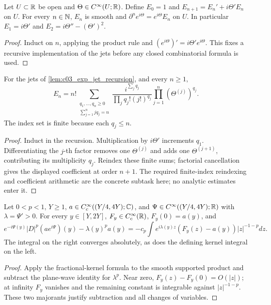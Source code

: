 \begin{lemma}
  \label{lem:c03_exp_jet_recursion}
  Let $U\subset\mathbb{R}$ be open and $\Theta\in C^\infty(U;\mathbb{R})$.
  Define $E_0=1$ and $E_{n+1}=E_n'+i\Theta'E_n$ on $U$.
  For every $n\in\mathbb{N}$, $E_n$ is smooth and
  $\partial^n e^{i\Theta}=e^{i\Theta}E_n$ on $U$.
  In particular $E_1=i\Theta'$ and $E_2=i\Theta''-(\Theta')^2$.
\end{lemma}
\begin{proof}
  Induct on $n$, applying the product rule and $(e^{i\Theta})'=i\Theta'e^{i\Theta}$.
  This fixes a recursive implementation of the jets before any closed combinatorial formula is used.
\end{proof}

\begin{lemma}
  \label{lem:c03_exp_jet_coefficients}
  For the jets of \cref{lem:c03_exp_jet_recursion}, and every $n\ge1$,
  \[
    E_n=n!\sum_{\substack{q_1,\ldots,q_n\ge0\\\sum_{j=1}^n j q_j=n}}
       \frac{i^{\sum_jq_j}}{\prod_jq_j!(j!)^{q_j}}
       \prod_{j=1}^n(\Theta^{(j)})^{q_j}.
  \]
  The index set is finite because each $q_j\le n$.
\end{lemma}
\begin{proof}
  Induct in the recursion. Multiplication by $i\Theta'$ increments $q_1$.
  Differentiating the $j$-th factor removes one $\Theta^{(j)}$ and adds one $\Theta^{(j+1)}$,
  contributing its multiplicity $q_j$. Reindex these finite sums; factorial cancellation gives
  the displayed coefficient at order $n+1$. The required finite-index reindexing and coefficient
  arithmetic are the concrete subtask here; no analytic estimates enter it.
\end{proof}

\begin{lemma}
  \label{lem:c03_mult_kernel_identity}
  Let $0<p<1$, $Y\ge1$, $a\in C_c^\infty((Y/4,4Y);\mathbb{C})$, and
  $\Psi\in C^\infty((Y/4,4Y);\mathbb{R})$ with $\lambda=\Psi'>0$.
  For every $y\in[Y,2Y]$, $F_y\in C_c^\infty(\mathbb{R})$, $F_y(0)=a(y)$, and
  \[
    e^{-i\Psi(y)}|D|^p(ae^{i\Psi})(y)-\lambda(y)^pa(y)
       =-c_p\int e^{i\lambda(y)z}(F_y(z)-a(y))|z|^{-1-p}dz.
  \]
  The integral on the right converges absolutely, as does the defining kernel integral on the left.
\end{lemma}
\begin{proof}
  Apply the fractional-kernel formula to the smooth supported product and subtract the
  plane-wave identity for $\lambda^p$. Near zero, $F_y(z)-F_y(0)=O(|z|)$; at infinity
  $F_y$ vanishes and the remaining constant is integrable against $|z|^{-1-p}$.
  These two majorants justify subtraction and all changes of variables.
\end{proof}

